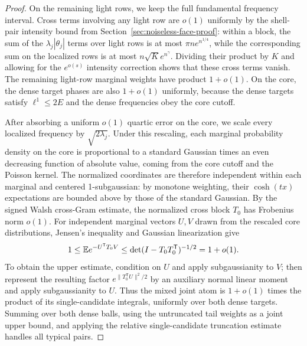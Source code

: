 \begin{proof}
On the remaining light rows, we keep the full fundamental frequency interval.
Cross terms involving any light row are \(o(1)\) uniformly by the shell-pair
intensity bound from Section~\ref{sec:noiseless-face-proof}: within a block,
the sum of the \(\lambda_j|\theta_j|\) terms over light rows is at most
\(\pi n e^{n^{1/4}}\), while the corresponding sum on the localized rows is at
most \(n\sqrt K e^{n^\gamma}\). Dividing their product by \(K\) and allowing
for the \(e^{o(s)}\) intensity correction shows that these cross terms vanish.
The remaining light-row marginal weights have product \(1+o(1)\). On the core,
the dense target phases are also \(1+o(1)\) uniformly, because the dense
targets satisfy \(\ell^1\le2E\) and the dense frequencies obey the core cutoff.

After absorbing a uniform \(o(1)\) quartic error on the core, we scale every
localized frequency by \(\sqrt{2\lambda_j}\). Under this rescaling, each
marginal probability density on the core is proportional to a standard Gaussian
times an even decreasing function of absolute value, coming from the core
cutoff and the Poisson kernel. The normalized coordinates are therefore
independent within each marginal and centered 1-subgaussian: by monotone
weighting, their \(\cosh(tx)\) expectations are bounded above by those of the
standard Gaussian. By the signed Walsh cross-Gram estimate, the normalized
cross block \(T_0\) has Frobenius norm \(o(1)\). For independent marginal
vectors \(U,V\) drawn from the rescaled core distributions, Jensen's
inequality and Gaussian linearization give
\[
 1\le\mathbb E e^{-U^{\mathsf T}T_0V}
 \le\det(I-T_0T_0^{\mathsf T})^{-1/2}=1+o(1).
\]
To obtain the upper estimate, condition on \(U\) and apply subgaussianity to
\(V\); then represent the resulting factor \(e^{\|T_0^{\mathsf T}U\|^2/2}\) by
an auxiliary normal linear moment and apply subgaussianity to \(U\). Thus the
mixed joint atom is \(1+o(1)\) times the product of its single-candidate
integrals, uniformly over both dense targets. Summing over both dense balls,
using the untruncated tail weights as a joint upper bound, and applying the
relative single-candidate truncation estimate handles all typical pairs.


\end{proof}
